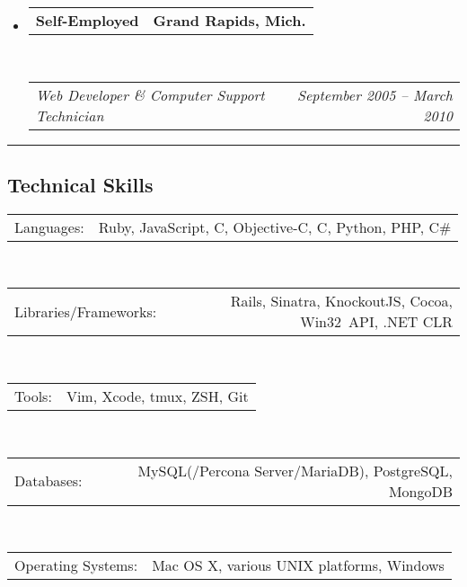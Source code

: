 \documentclass[12pt,letterpaper]{article}
\makeatletter
\newenvironment{indentedsection}[1]
{\begin{list}{}
  {\setlength{\leftmargin}{#1}}
  \item[]
}
{\end{list}}
\newcommand{\floatcols}[2]
{\begin{tabular*}{\linewidth}{l@{\extracolsep{\fill}}r}
  #1 &
  #2 \\
\end{tabular*}}
\newcommand{\CPP}
{C\nolinebreak[4]\hspace{-.05em}\raisebox{.22ex}{\footnotesize\bf ++}}
\makeatother
\begin{document}
\begin{itemize}
  \item
    \floatcols
      {\textbf{Self-Employed}}
      {\textbf{Grand Rapids, Mich.}}
    \\
    \floatcols
      {\emph{Web Developer \& Computer Support Technician}}
      {\emph{September 2005 -- March 2010}}
\end{itemize}


\hrule
\vspace{-0.4em}
\subsection*{Technical Skills}

\begin{indentedsection}{\parindent}
  \floatcols
    {Languages:}
    {Ruby, JavaScript, C, Objective-C, \CPP, Python, PHP, C\#}
  \\[.4em]
  \floatcols
    {Libraries/Frameworks:}
    {Rails, Sinatra, KnockoutJS, Cocoa, Win32~API, .NET CLR}
  \\[.4em]
  \floatcols
    {Tools:}
    {Vim, Xcode, tmux, ZSH, Git}
  \\[.4em]
  \floatcols
    {Databases:}
    {MySQL(/Percona Server/MariaDB), PostgreSQL, MongoDB}
  \\[.4em]
  \floatcols
    {Operating Systems:}
    {Mac OS X, various UNIX platforms, Windows}
\end{indentedsection}
\end{document}
